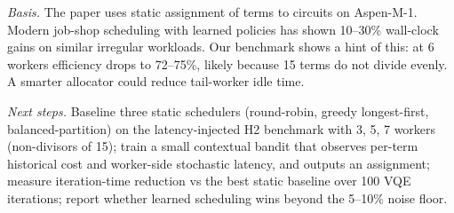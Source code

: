 \begin{enumerate}
\emph{Basis.} The paper uses static assignment of terms to circuits on Aspen-M-1. Modern job-shop scheduling with learned policies has shown 10--30\% wall-clock gains on similar irregular workloads. Our benchmark shows a hint of this: at 6 workers efficiency drops to 72--75\%, likely because 15 terms do not divide evenly. A smarter allocator could reduce tail-worker idle time.

\emph{Next steps.} Baseline three static schedulers (round-robin, greedy longest-first, balanced-partition) on the latency-injected H2 benchmark with 3, 5, 7 workers (non-divisors of 15); train a small contextual bandit that observes per-term historical cost and worker-side stochastic latency, and outputs an assignment; measure iteration-time reduction vs the best static baseline over 100 VQE iterations; report whether learned scheduling wins beyond the 5--10\% noise floor.

\end{enumerate}
